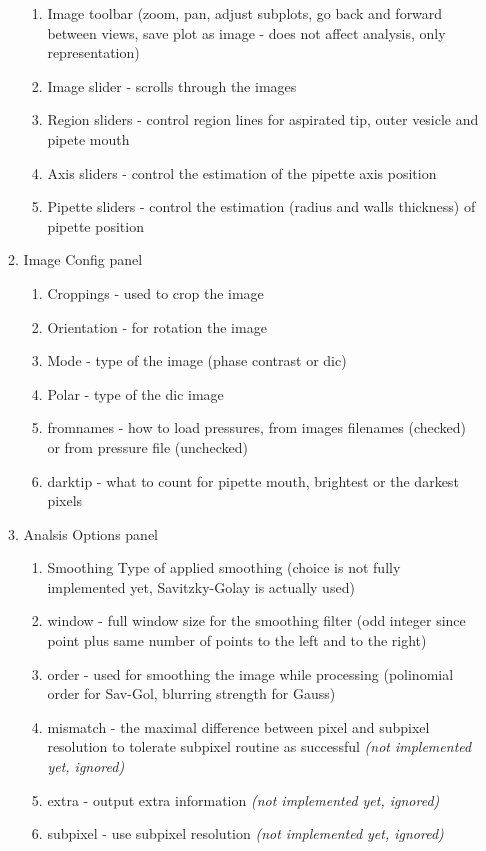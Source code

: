 \begin{itemize}
\begin{enumerate}
\begin{enumerate}
						\item Image toolbar (zoom, pan, adjust subplots, go back and forward between views, save plot as image - does not affect analysis, only representation)
						\item Image slider - scrolls through the images
						\item Region sliders - control region lines for aspirated tip, outer vesicle and pipete mouth
						\item Axis sliders - control the estimation of the pipette axis position
						\item Pipette sliders - control the estimation (radius and walls thickness) of pipette position
					\end{enumerate}
				\item Image Config panel
					\begin{enumerate}
						\item Croppings - used to crop the image
						\item Orientation - for rotation the image
						\item Mode - type of the image (phase contrast or dic)
						\item Polar - type of the dic image
						\item fromnames - how to load pressures, from images filenames (checked) or from pressure file (unchecked)
						\item darktip - what to count for pipette mouth, brightest or the darkest pixels
					\end{enumerate}
				\item Analsis Options panel
					\begin{enumerate}
						\item Smoothing Type of applied smoothing (choice is not fully implemented yet, Savitzky-Golay is actually used)
						\item window - full window size for the smoothing filter (odd integer since point plus same number of points to the left and to the right)
						\item order - used for smoothing the image while processing (polinomial order for Sav-Gol, blurring strength for Gauss)
						\item mismatch - the maximal difference between pixel and subpixel resolution to tolerate subpixel routine as successful \emph{(not implemented yet, ignored)}
						\item extra - output extra information \emph{(not implemented yet, ignored)}
						\item subpixel - use subpixel resolution \emph{(not implemented yet, ignored)}

\end{enumerate}
\end{enumerate}
\end{itemize}
